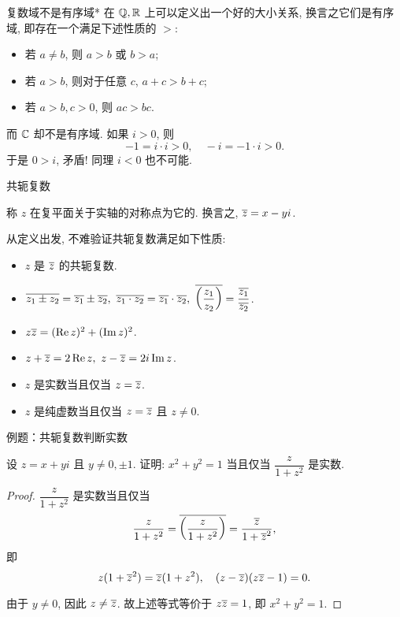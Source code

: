 \begin{frame}{复数域不是有序域*}
\onslide<+->
在 ${\mathbb{Q}},{\mathbb{R}}$ 上可以定义出一个好的大小关系,
\onslide<+->
换言之它们是有序域, 即存在一个满足下述性质的 $>$:
\begin{itemize}
\item 若 $a\neq b$, 则 $a>b$ 或 $b>a$;
\item 若 $a>b$, 则对于任意 $c$, $a+c>b+c$;
\item 若 $a>b,c>0$, 则 $ac>bc$.
\end{itemize}

\onslide<+->
而 ${\mathbb{C}}$ 却不是有序域.
\onslide<+->
如果 $i>0$, 则
\[-1=i\cdot i>0,\quad -i=-1\cdot i>0.\]
\onslide<+->
于是 $0>i$, 矛盾! 同理 $i<0$ 也不可能.
\end{frame}


\begin{frame}{共轭复数}
\begin{definition}
称 $z$ 在复平面关于实轴的对称点为它的.
换言之, $\overline z=x-yi$.
\end{definition}
\onslide<+->
从定义出发, 不难验证共轭复数满足如下性质:
\begin{conclusion}
\begin{itemize}
\item $z$ 是 $\overline z$ 的共轭复数.
\item $\ov{z_1\pm z_2}=\ov{z_1}\pm\ov{z_2},\ 
\ov{z_1\cdot z_2}=\ov{z_1}\cdot\ov{z_2},\ 
\ov{\left(\dfrac{z_1}{z_2}\right)}=\dfrac{\ov{z_1}}{\ov{z_2}}$.
\item $z\overline{z}=(\operatorname{Re} z)^2+(\operatorname{Im} z)^2$.
\item $z+\overline z=2\operatorname{Re} z,\ z-\overline z=2i\operatorname{Im} z$.
\item $z$ 是实数当且仅当 $z=\overline z$.
\item $z$ 是纯虚数当且仅当 $z=\overline z$ 且 $z\neq 0$.
\end{itemize}
\end{conclusion}
\end{frame}


\begin{frame}{例题：共轭复数判断实数}
\begin{example}
设 $z=x+yi$ 且 $y\neq 0,\pm1$. 证明: $x^2+y^2=1$ 当且仅当 $\dfrac z{1+z^2}$ 是实数.
\end{example}
\begin{proof}
\indent
$\dfrac z{1+z^2}$ 是实数当且仅当
\[\frac z{1+z^2}=\overline{\left(\frac z{1+z^2}\right)}=\frac{\overline z}{1+{\overline z}^2},\]
\onslide<+->
即
\vspace{-\baselineskip}
\[z(1+{\overline z}^2)=\overline z(1+z^2),\quad (z-\overline z)(z\overline z-1)=0.\]

\onslide<+->
\indent
由于 $y\neq0$, 因此 $z\neq \overline z$.
\onslide<+->
故上述等式等价于 $z\overline z=1$, 即 $x^2+y^2=1$.
\end{proof}
\end{frame}


